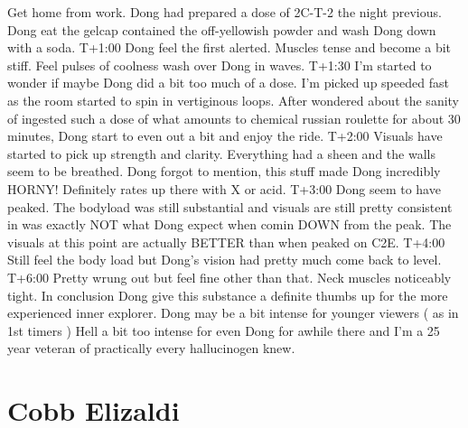 \documentclass[12pt]{book}
\begin{document}
Get home from work. Dong had prepared a dose of 2C-T-2 the night previous. Dong eat the gelcap contained the off-yellowish powder and wash Dong down with a soda. T+1:00 Dong feel the first alerted. Muscles tense and become a bit stiff. Feel pulses of coolness wash over Dong in waves. T+1:30 I'm started to wonder if maybe Dong did a bit too much of a dose. I'm picked up speeded fast as the room started to spin in vertiginous loops. After wondered about the sanity of ingested such a dose of what amounts to chemical russian roulette for about 30 minutes, Dong start to even out a bit and enjoy the ride. T+2:00 Visuals have started to pick up strength and clarity. Everything had a sheen and the walls seem to be breathed. Dong forgot to mention, this stuff made Dong incredibly HORNY! Definitely rates up there with X or acid. T+3:00 Dong seem to have peaked. The bodyload was still substantial and visuals are still pretty consistent in was exactly NOT what Dong expect when comin DOWN from the peak. The visuals at this point are actually BETTER than when peaked on C2E. T+4:00 Still feel the body load but Dong's vision had pretty much come back to level. T+6:00 Pretty wrung out but feel fine other than that. Neck muscles noticeably tight. In conclusion Dong give this substance a definite thumbs up for the more experienced inner explorer. Dong may be a bit intense for younger viewers ( as in 1st timers ) Hell a bit too intense for even Dong for awhile there and I'm a 25 year veteran of practically every hallucinogen knew.






\chapter{Cobb Elizaldi}
\end{document}
